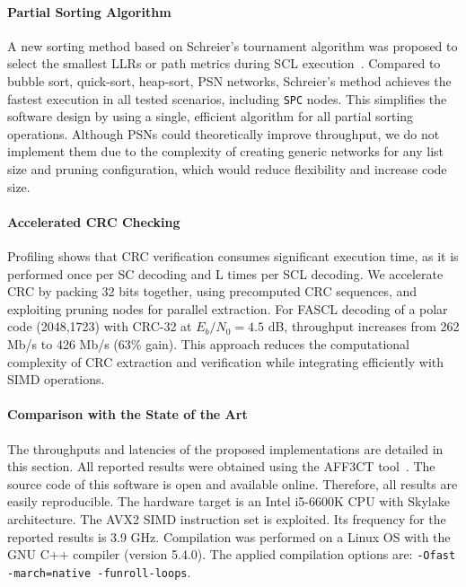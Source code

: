 \documentclass[11pt]{report}
\begin{document}
\paragraph{Partial Sorting Algorithm}
A new sorting method based on Schreier's tournament algorithm was proposed to select the smallest LLRs or path metrics during SCL execution~\cite{Schreier1932}. Compared to bubble sort, quick-sort, heap-sort, PSN networks, Schreier's method achieves the fastest execution in all tested scenarios, including \texttt{SPC} nodes. This simplifies the software design by using a single, efficient algorithm for all partial sorting operations. Although PSNs could theoretically improve throughput, we do not implement them due to the complexity of creating generic networks for any list size and pruning configuration, which would reduce flexibility and increase code size.

\paragraph{Accelerated CRC Checking}
Profiling shows that CRC verification consumes significant execution time, as it is performed once per SC decoding and L times per SCL decoding. We accelerate CRC by packing 32 bits together, using precomputed CRC sequences, and exploiting pruning nodes for parallel extraction. For FASCL decoding of a polar code (2048,1723) with CRC-32 at $E_b/N_0=4.5$ dB, throughput increases from 262 Mb/s to 426 Mb/s (63\% gain). This approach reduces the computational complexity of CRC extraction and verification while integrating efficiently with SIMD operations.

\paragraph{Comparison with the State of the Art}
The throughputs and latencies of the proposed implementations are detailed in this section. All reported results were obtained using the AFF3CT tool~\cite{cassagne:hal-02358306}. The source code of this software is open and available online. Therefore, all results are easily reproducible. The hardware target is an Intel i5-6600K CPU with Skylake architecture. The AVX2 SIMD instruction set is exploited. Its frequency for the reported results is 3.9 GHz. Compilation was performed on a Linux OS with the GNU C++ compiler (version 5.4.0). The applied compilation options are: \texttt{-Ofast -march=native -funroll-loops}.
\end{document}
